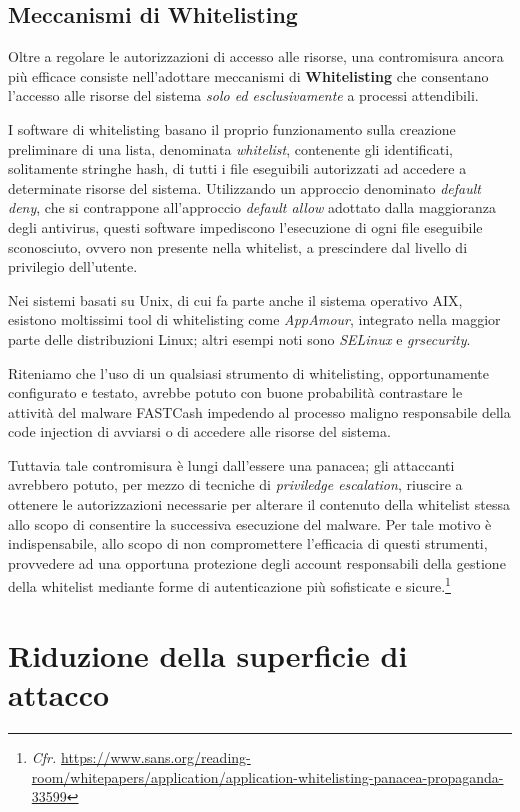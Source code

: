 \documentclass[10pt,a4paper, titlepage]{report}
\begin{document}
\subsection{Meccanismi di Whitelisting}

Oltre a regolare le autorizzazioni di accesso alle risorse, una contromisura ancora più efficace consiste nell'adottare meccanismi di \textbf{Whitelisting} che consentano l'accesso alle risorse del sistema \textit{solo ed esclusivamente} a processi attendibili. 

I software di whitelisting basano il proprio funzionamento sulla creazione preliminare di una lista, denominata \textit{whitelist}, contenente gli identificati, solitamente stringhe hash, di tutti i file eseguibili autorizzati ad accedere a determinate risorse del sistema. Utilizzando un approccio denominato \textit{default deny}, che si contrappone all'approccio \textit{default allow} adottato dalla maggioranza degli antivirus, questi software impediscono l'esecuzione di ogni file eseguibile sconosciuto, ovvero non presente nella whitelist, a prescindere dal livello di privilegio dell'utente.

Nei sistemi basati su Unix, di cui fa parte anche il sistema operativo AIX, esistono moltissimi tool di whitelisting come \textit{AppAmour}, integrato nella maggior parte delle distribuzioni Linux; altri esempi noti sono \textit{SELinux} e \textit{grsecurity}.

Riteniamo che l'uso di un qualsiasi strumento di whitelisting, opportunamente configurato e testato, avrebbe potuto con buone probabilità contrastare le attività del malware FASTCash impedendo al processo maligno responsabile della code injection di avviarsi o di accedere alle risorse del sistema.

Tuttavia tale contromisura è lungi dall'essere una panacea; gli attaccanti avrebbero potuto, per mezzo di tecniche di \textit{priviledge escalation}, riuscire a ottenere le autorizzazioni necessarie per alterare il contenuto della whitelist stessa allo scopo di consentire la successiva esecuzione del malware. Per tale motivo è indispensabile, allo scopo di non compromettere l'efficacia di questi strumenti, provvedere ad una opportuna protezione degli account responsabili della gestione della whitelist mediante forme di autenticazione più sofisticate e sicure.\footnote{\textit{Cfr.} \url{https://www.sans.org/reading-room/whitepapers/application/application-whitelisting-panacea-propaganda-33599}}

\section{Riduzione della superficie di attacco}
\end{document}
